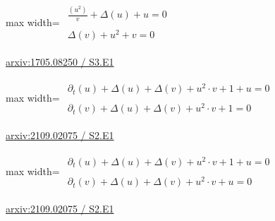 \documentclass[UTF8,10pt,a4paper,fontset=mac]{ctexart}
\begin{document}
\begin{minipage}{\linewidth}\begin{center}\begin{adjustbox}{max width=\linewidth}$\displaystyle\begin{gathered}\begin{gathered}\frac{(u^{2})}{v}+\Delta(u)+u=0\end{gathered}\\[5pt]\begin{gathered}\Delta(v)+u^{2}+v=0\end{gathered}\end{gathered}$\end{adjustbox}\end{center}{\small\href{https://arxiv.org/html/1705.08250#S3.E1}{arxiv:1705.08250 / S3.E1}}\par\end{minipage}\par\vspace{6mm}

\begin{minipage}{\linewidth}\begin{center}\begin{adjustbox}{max width=\linewidth}$\displaystyle\begin{gathered}\begin{gathered}\partial_{t}(u)+\Delta(u)+\Delta(v)+u^{2}\cdot v+1+u=0\end{gathered}\\[5pt]\begin{gathered}\partial_{t}(v)+\Delta(u)+\Delta(v)+u^{2}\cdot v+1=0\end{gathered}\end{gathered}$\end{adjustbox}\end{center}{\small\href{https://arxiv.org/html/2109.02075#S2.E1}{arxiv:2109.02075 / S2.E1}}\par\end{minipage}\par\vspace{6mm}

\begin{minipage}{\linewidth}\begin{center}\begin{adjustbox}{max width=\linewidth}$\displaystyle\begin{gathered}\begin{gathered}\partial_{t}(u)+\Delta(u)+\Delta(v)+u^{2}\cdot v+1+u=0\end{gathered}\\[5pt]\begin{gathered}\partial_{t}(v)+\Delta(u)+\Delta(v)+u^{2}\cdot v+u=0\end{gathered}\end{gathered}$\end{adjustbox}\end{center}{\small\href{https://arxiv.org/html/2109.02075#S2.E1}{arxiv:2109.02075 / S2.E1}}\par\end{minipage}\par\vspace{6mm}
\end{document}
